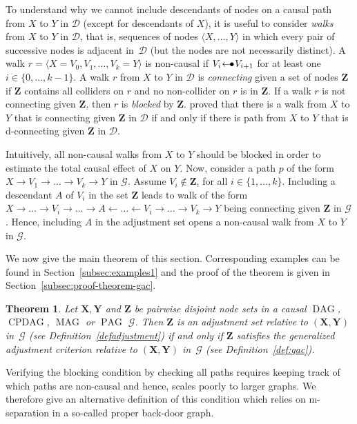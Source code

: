 \documentclass[11pt,a4paper]{article}
\newtheorem{theorem}[definition]{Theorem}
\DeclareMathOperator{\CPDAG}{CPDAG}
\DeclareMathOperator{\DAG}{DAG}
\DeclareMathOperator{\MAG}{MAG}
\DeclareMathOperator{\PAG}{PAG}
\newcommand{\blck}{the blocking condition\xspace}
\newcommand{\g}[1][G]{\mathcal{#1}}
\newcommand{\arrowbullet}{
  \setlength{\unitlength}{1mm}
  \begin{picture}(5,1)(0,0)
    \put(0.2,0){$\leftarrow$}
    \put(3,0){$\bullet$}
  \end{picture}
}
\begin{document}
To understand why we cannot include descendants of nodes on a causal path from $X$ to $Y$ in $\g[D]$ (except for descendants of $X$), it is useful to consider \textit{walks} from $X$ to $Y$ in $\g[D]$, that is, sequences of nodes $\langle X, \dots,Y \rangle$ in which every pair of successive nodes is adjacent in~$\g[D]$ (but the nodes are not necessarily distinct). A walk $r = \langle  X =V_0,V_1,\dots,V_k=Y \rangle$ is non-causal if $V_i \arrowbullet V_{i+1}$ for at least one $i \in \{0,\dots,k-1\}$. A walk $r$ from $X$ to $Y$ in $\g[D]$ is \textit{connecting} given a set of nodes $\mathbf{Z}$ if $\mathbf{Z}$ contains all colliders on $r$ and no non-collider on $r$ is in $\mathbf{Z}$. If a walk $r$ is not connecting given $\mathbf{Z}$, then $r$ is \textit{blocked} by $\mathbf{Z}$. \cite{koster2002marginalizing} proved that there is a walk from $X$ to $Y$ that is connecting given $\mathbf{Z}$ in $\g[D]$ if and only if there is path from $X$ to $Y$ that is d-connecting given $\mathbf{Z}$ in $\g[D]$.

Intuitively, all non-causal walks from $X$ to $Y$ should be blocked in order to estimate the total causal effect of $X$ on $Y$. Now, consider a path $p$ of the form $X \rightarrow V_1 \rightarrow \dots \rightarrow V_k \rightarrow Y$ in $\g$. Assume $V_i \notin \mathbf{Z}$, for all $i \in \{1,\dots,k\}$. Including a descendant $A$ of $V_i$ in the set $\mathbf{Z}$ leads to walk of the form $X \rightarrow \dots \rightarrow V_i \rightarrow \dots \rightarrow A \leftarrow \dots \leftarrow V_i \rightarrow \dots \rightarrow V_k \rightarrow Y$ being connecting given $\mathbf{Z}$ in $\g$. Hence, including $A$ in the adjustment set opens a non-causal walk from $X$ to $Y$ in $\g$. 

We now give the main theorem of this section. Corresponding examples can be found in Section~\ref{subsec:examples1} and the proof of the theorem is given in Section~\ref{subsec:proof-theorem-gac}.

\begin{theorem}
     Let $\mathbf{X,Y}$ and $\mathbf{Z}$ be pairwise disjoint node sets in a causal $\DAG$, $\CPDAG$, $\MAG$ or $\PAG$ $\g$. Then $\mathbf{Z}$ is an adjustment set relative to $(\mathbf{X},\mathbf{Y})$ in~$\g$ (see Definition~\ref{defadjustment}) if and only if $\mathbf{Z}$ satisfies the generalized adjustment criterion relative to $(\mathbf{X},\mathbf{Y})$ in~$\g$ (see Definition~\ref{def:gac}).
   \label{theorem:gac}
\end{theorem}

Verifying \blck by checking all paths requires keeping track of which paths are non-causal and hence, scales poorly to larger graphs. We therefore give an alternative definition of this condition which relies on m-separation in a so-called proper back-door graph.
\end{document}

